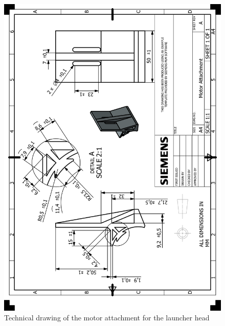 \documentclass[12pt]{report}
\begin{document}
\begin{appendices}
\begin{figure}[H]
    \centering
    \includegraphics[width=\textwidth]{HP_Motor Attachment.png} 
    \caption{Technical drawing of the motor attachment for the launcher head}
    \label{fig:technical-drawing}
\end{figure}


\end{appendices}
\end{document}
